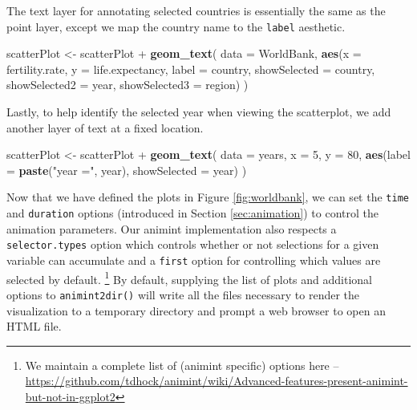 \documentclass[12pt,]{isuthesis}
\newenvironment{Shaded}{\begin{snugshade}}{\end{snugshade}}
\newcommand{\KeywordTok}[1]{\textcolor[rgb]{0.13,0.29,0.53}{\textbf{{#1}}}}
\newcommand{\DataTypeTok}[1]{\textcolor[rgb]{0.13,0.29,0.53}{{#1}}}
\newcommand{\DecValTok}[1]{\textcolor[rgb]{0.00,0.00,0.81}{{#1}}}
\newcommand{\StringTok}[1]{\textcolor[rgb]{0.31,0.60,0.02}{{#1}}}
\newcommand{\NormalTok}[1]{{#1}}
\let\rmarkdownfootnote\footnote%
\def\footnote{\protect\rmarkdownfootnote}
\begin{document}
The text layer for annotating selected countries is essentially the same
as the point layer, except we map the country name to the \texttt{label}
aesthetic.

\begin{Shaded}
\begin{Highlighting}[]
\NormalTok{scatterPlot <-}\StringTok{ }\NormalTok{scatterPlot +}\StringTok{ }\KeywordTok{geom_text}\NormalTok{(}
  \DataTypeTok{data =} \NormalTok{WorldBank,}
  \KeywordTok{aes}\NormalTok{(}\DataTypeTok{x =} \NormalTok{fertility.rate, }\DataTypeTok{y =} \NormalTok{life.expectancy,}
      \DataTypeTok{label =} \NormalTok{country,}
      \DataTypeTok{showSelected =} \NormalTok{country,}
      \DataTypeTok{showSelected2 =} \NormalTok{year,}
      \DataTypeTok{showSelected3 =} \NormalTok{region)}
\NormalTok{)}
\end{Highlighting}
\end{Shaded}

Lastly, to help identify the selected year when viewing the scatterplot,
we add another layer of text at a fixed location.

\begin{Shaded}
\begin{Highlighting}[]
\NormalTok{scatterPlot <-}\StringTok{ }\NormalTok{scatterPlot +}\StringTok{ }\KeywordTok{geom_text}\NormalTok{(}
  \DataTypeTok{data =} \NormalTok{years, }\DataTypeTok{x =} \DecValTok{5}\NormalTok{, }\DataTypeTok{y =} \DecValTok{80}\NormalTok{,}
  \KeywordTok{aes}\NormalTok{(}\DataTypeTok{label =} \KeywordTok{paste}\NormalTok{(}\StringTok{"year ="}\NormalTok{, year),}
      \DataTypeTok{showSelected =} \NormalTok{year)}
\NormalTok{)}
\end{Highlighting}
\end{Shaded}

Now that we have defined the plots in Figure \ref{fig:worldbank}, we can
set the \texttt{time} and \texttt{duration} options (introduced in
Section \ref{sec:animation}) to control the animation parameters. Our
animint implementation also respects a \texttt{selector.types} option
which controls whether or not selections for a given variable can
accumulate and a \texttt{first} option for controlling which values are
selected by default.
\footnote{We maintain a complete list of (animint specific) options here --
\url{https://github.com/tdhock/animint/wiki/Advanced-features-present-animint-but-not-in-ggplot2}}
By default, supplying the list of plots and additional options to
\texttt{animint2dir()} will write all the files necessary to render the
visualization to a temporary directory and prompt a web browser to open
an HTML file.
\end{document}
